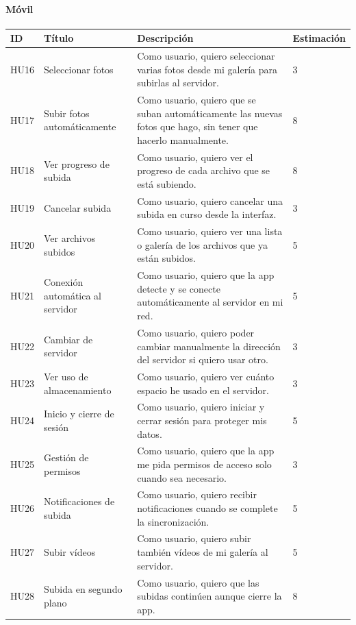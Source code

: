 \paragraph{Móvil}
\begin{tabularx}{\textwidth}{|l|l|>{\raggedright\arraybackslash}X|l|}
    \hline
    ID & Título & Descripción & Estimación \\
    \hline
    HU16 & Seleccionar fotos & Como usuario, quiero seleccionar varias fotos desde mi galería para subirlas al servidor. & 3 \\
    \hline
    HU17 & Subir fotos automáticamente & Como usuario, quiero que se suban automáticamente las nuevas fotos que hago, sin tener que hacerlo manualmente. & 8 \\
    \hline
    HU18 & Ver progreso de subida & Como usuario, quiero ver el progreso de cada archivo que se está subiendo. & 8 \\
    \hline
    HU19 & Cancelar subida & Como usuario, quiero cancelar una subida en curso desde la interfaz. & 3 \\
    \hline
    HU20 & Ver archivos subidos & Como usuario, quiero ver una lista o galería de los archivos que ya están subidos. & 5 \\
    \hline
    HU21 & Conexión automática al servidor & Como usuario, quiero que la app detecte y se conecte automáticamente al servidor en mi red. & 5 \\
    \hline
    HU22 & Cambiar de servidor & Como usuario, quiero poder cambiar manualmente la dirección del servidor si quiero usar otro. & 3 \\
    \hline
    HU23 & Ver uso de almacenamiento & Como usuario, quiero ver cuánto espacio he usado en el servidor. & 3 \\
    \hline
    HU24 & Inicio y cierre de sesión & Como usuario, quiero iniciar y cerrar sesión para proteger mis datos. & 5 \\
    \hline
    HU25 & Gestión de permisos & Como usuario, quiero que la app me pida permisos de acceso solo cuando sea necesario. & 3 \\
    \hline
    HU26 & Notificaciones de subida & Como usuario, quiero recibir notificaciones cuando se complete la sincronización. & 5 \\
    \hline
    HU27 & Subir vídeos & Como usuario, quiero subir también vídeos de mi galería al servidor. & 5 \\
    \hline
    HU28 & Subida en segundo plano & Como usuario, quiero que las subidas continúen aunque cierre la app. & 8 \\

\end{tabularx}
